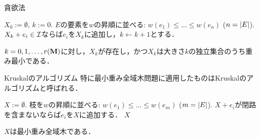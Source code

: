 \documentclass[14pt,aspectratio=169,xcolor=dvipsnames,table,onlytextwidth,dvipdfmx]{beamer}
\begin{document}
\begin{frame}{貪欲法}

    \begin{block}{}
    \begin{algorithmic}[1]
        \STATE $X_0 := \emptyset$, $k := 0$.
        \STATE $E$の要素を$w$の昇順に並べる: $w(e_1) \leq \dots \leq w(e_n)$ ($n = \lvert E\rvert$).
            \STATE $X_k + e_i \in \mathcal{I}$ならば$e_i$を$X_k$に追加し，$k \gets k + 1$とする． \\
        \ENDFOR
    \end{algorithmic}
    \end{block}

    \vfill
    \begin{theorem}
        $k = 0, 1, \dots, r(\mathbf{M})$に対し，$X_k$が存在し，かつ$X_k$は大きさ$k$の独立集合のうち重み最小である．
    \end{theorem}
\end{frame}

\begin{frame}{Kruskalのアルゴリズム}
    特に最小重み全域木問題に適用したものは\alert{Kruskalのアルゴリズム}と呼ばれる．
    
    \begin{block}{}
    \begin{algorithmic}[1]
        \STATE $X := \emptyset$.
        \STATE 枝を$w$の昇順に並べる: $w(e_1) \leq \dots \leq w(e_m)$ ($m = \lvert E\rvert$).
            \STATE $X + e_i$が閉路を含まないならば$e_i$を$X$に追加する．
        \ENDFOR
        \RETURN $X$
    \end{algorithmic}
    \end{block}

    \vfill
    \begin{corollary}
        $X$は最小重み全域木である．
    \end{corollary}
\end{frame}

\end{document}
